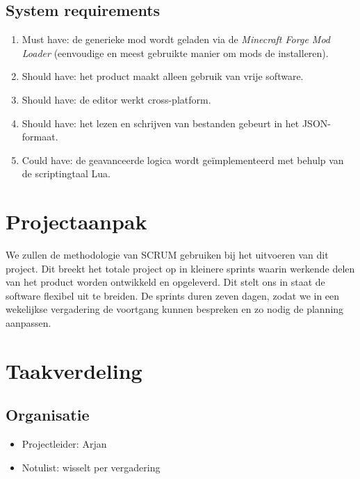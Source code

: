 \documentclass{article}
\begin{document}
	\subsection{System requirements}
	\begin{enumerate}
		\item Must have: de generieke mod wordt geladen via de \emph{Minecraft Forge Mod Loader} (eenvoudige en meest gebruikte manier om mods de installeren).
		
		\item Should have: het product maakt alleen gebruik van vrije software.
		\item Should have: de editor werkt cross-platform.
		\item Should have: het lezen en schrijven van bestanden gebeurt in het JSON-formaat.
		
		\item Could have: de geavanceerde logica wordt ge\"implementeerd met behulp van de scriptingtaal Lua.
	\end{enumerate}

\newpage

\section{Projectaanpak}
	We zullen de methodologie van SCRUM gebruiken bij het uitvoeren van dit project. Dit breekt het totale project op in kleinere sprints waarin werkende delen van het product worden ontwikkeld en opgeleverd. Dit stelt ons in staat de software flexibel uit te breiden. De sprints duren zeven dagen, zodat we in een wekelijkse vergadering de voortgang kunnen bespreken en zo nodig de planning aanpassen.
	
\section{Taakverdeling}
	\subsection{Organisatie}
	\begin{itemize}
		\item Projectleider: Arjan
		\item Notulist: wisselt per vergadering
	\end{itemize}
\end{document}
